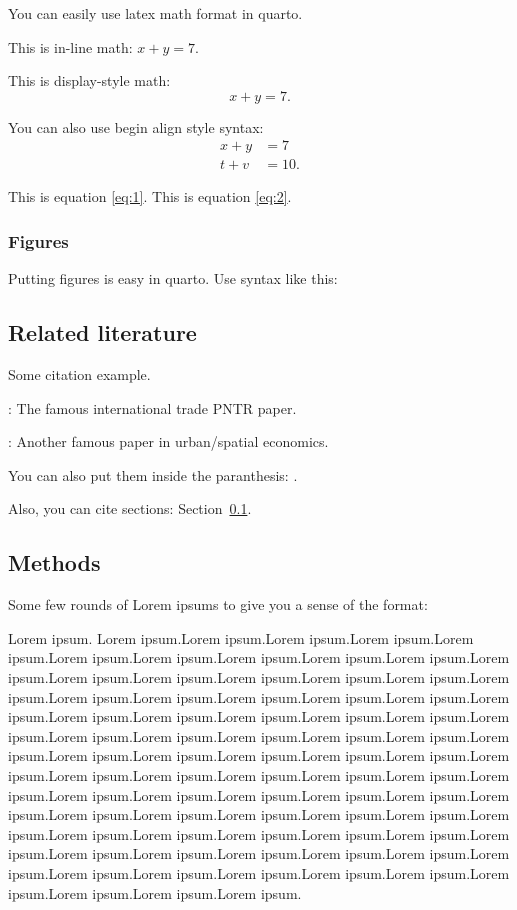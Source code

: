 \documentclass[
  11pt]{article}
\begin{document}
You can easily use latex math format in quarto.

This is in-line math: \(x + y = 7\).

This is display-style math: \[x + y = 7.\]

You can also use begin align style syntax: \begin{align}
  x + y &= 7\label{eq:1}\\
  t + v &= 10.\label{eq:2}
\end{align}

This is equation \ref{eq:1}. This is equation \ref{eq:2}.

\subsubsection{Figures}\label{figures}

Putting figures is easy in quarto. Use syntax like this:

\subsection{Related literature}\label{sec-lit}

Some citation example.

\citet{schott}: The famous international trade PNTR paper.

\citet{berlin}: Another famous paper in urban/spatial economics.

You can also put them inside the paranthesis: \citep{schott, berlin}.

Also, you can cite sections: Section~\ref{sec-lit}.

\subsection{Methods}\label{sec-meth}

Some few rounds of Lorem ipsums to give you a sense of the format:

Lorem ipsum. Lorem ipsum.Lorem ipsum.Lorem ipsum.Lorem ipsum.Lorem
ipsum.Lorem ipsum.Lorem ipsum.Lorem ipsum.Lorem ipsum.Lorem ipsum.Lorem
ipsum.Lorem ipsum.Lorem ipsum.Lorem ipsum.Lorem ipsum.Lorem ipsum.Lorem
ipsum.Lorem ipsum.Lorem ipsum.Lorem ipsum.Lorem ipsum.Lorem ipsum.Lorem
ipsum.Lorem ipsum.Lorem ipsum.Lorem ipsum.Lorem ipsum.Lorem ipsum.Lorem
ipsum.Lorem ipsum.Lorem ipsum.Lorem ipsum.Lorem ipsum.Lorem ipsum.Lorem
ipsum.Lorem ipsum.Lorem ipsum.Lorem ipsum.Lorem ipsum.Lorem ipsum.Lorem
ipsum.Lorem ipsum.Lorem ipsum.Lorem ipsum.Lorem ipsum.Lorem ipsum.Lorem
ipsum.Lorem ipsum.Lorem ipsum.Lorem ipsum.Lorem ipsum.Lorem ipsum.Lorem
ipsum.Lorem ipsum.Lorem ipsum.Lorem ipsum.Lorem ipsum.Lorem ipsum.Lorem
ipsum.Lorem ipsum.Lorem ipsum.Lorem ipsum.Lorem ipsum.Lorem ipsum.Lorem
ipsum.Lorem ipsum.Lorem ipsum.Lorem ipsum.Lorem ipsum.Lorem ipsum.Lorem
ipsum.Lorem ipsum.Lorem ipsum.Lorem ipsum.Lorem ipsum.Lorem ipsum.Lorem
ipsum.Lorem ipsum.Lorem ipsum.Lorem ipsum.
\end{document}
